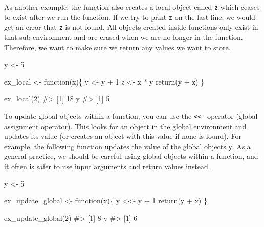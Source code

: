 \documentclass[
  letterpaper,
]{latex/krantz}
\makeatletter
\newenvironment{Shaded}{\begin{snugshade}}{\end{snugshade}}
\newcommand{\CommentTok}[1]{\textcolor[rgb]{0.37,0.37,0.37}{#1}}
\newcommand{\ControlFlowTok}[1]{\textcolor[rgb]{0.00,0.23,0.31}{#1}}
\newcommand{\DecValTok}[1]{\textcolor[rgb]{0.68,0.00,0.00}{#1}}
\newcommand{\FunctionTok}[1]{\textcolor[rgb]{0.28,0.35,0.67}{#1}}
\newcommand{\NormalTok}[1]{\textcolor[rgb]{0.00,0.23,0.31}{#1}}
\newcommand{\OtherTok}[1]{\textcolor[rgb]{0.00,0.23,0.31}{#1}}
\newcommand{\SpecialCharTok}[1]{\textcolor[rgb]{0.37,0.37,0.37}{#1}}
\newenvironment{kframe}{%
\medskip{}
\setlength{\fboxsep}{.8em}
 \def\at@end@of@kframe{}%
 \ifinner\ifhmode%
  \def\at@end@of@kframe{\end{minipage}}%
  \begin{minipage}{\columnwidth}%
 \fi\fi%
 \def\FrameCommand##1{\hskip\@totalleftmargin \hskip-\fboxsep
 \colorbox{shadecolor}{##1}\hskip-\fboxsep
     \hskip-\linewidth \hskip-\@totalleftmargin \hskip\columnwidth}%
 \MakeFramed {\advance\hsize-\width
   \@totalleftmargin\z@ \linewidth\hsize
   \@setminipage}}%
 {\par\unskip\endMakeFramed%
 \at@end@of@kframe}
\renewenvironment{Shaded}{\begin{kframe}}{\end{kframe}}
\makeatother
\begin{document}
As another example, the function also creates a local object called
\texttt{z} which ceases to exist after we run the function. If we try to
print \texttt{z} on the last line, we would get an error that \texttt{z}
is not found. All objects created inside functions only exist in that
sub-environment and are erased when we are no longer in the function.
Therefore, we want to make sure we return any values we want to store.

\begin{Shaded}
\begin{Highlighting}[]
\NormalTok{y }\OtherTok{\textless{}{-}} \DecValTok{5}

\NormalTok{ex\_local }\OtherTok{\textless{}{-}} \ControlFlowTok{function}\NormalTok{(x)\{}
\NormalTok{  y }\OtherTok{\textless{}{-}}\NormalTok{ y }\SpecialCharTok{+} \DecValTok{1}
\NormalTok{  z }\OtherTok{\textless{}{-}}\NormalTok{ x }\SpecialCharTok{*}\NormalTok{ y}
  \FunctionTok{return}\NormalTok{(y }\SpecialCharTok{+}\NormalTok{ z)}
\NormalTok{\}}

\FunctionTok{ex\_local}\NormalTok{(}\DecValTok{2}\NormalTok{)}
\CommentTok{\#\textgreater{} [1] 18}
\NormalTok{y}
\CommentTok{\#\textgreater{} [1] 5}
\end{Highlighting}
\end{Shaded}

To update global objects within a function, you can use the
\texttt{\textless{}\textless{}-} operator (global assignment
operator). This looks for an object in the
global environment and updates its value (or creates an object with this
value if none is found). For example, the following function updates the
value of the global objects \texttt{y}. As a general practice, we should
be careful using global objects within a function, and it often is safer
to use input arguments and return values instead.

\begin{Shaded}
\begin{Highlighting}[]
\NormalTok{y }\OtherTok{\textless{}{-}} \DecValTok{5}

\NormalTok{ex\_update\_global }\OtherTok{\textless{}{-}} \ControlFlowTok{function}\NormalTok{(x)\{}
\NormalTok{  y }\OtherTok{\textless{}\textless{}{-}}\NormalTok{ y }\SpecialCharTok{+} \DecValTok{1}
  \FunctionTok{return}\NormalTok{(y }\SpecialCharTok{+}\NormalTok{ x)}
\NormalTok{\}}

\FunctionTok{ex\_update\_global}\NormalTok{(}\DecValTok{2}\NormalTok{)}
\CommentTok{\#\textgreater{} [1] 8}
\NormalTok{y}
\CommentTok{\#\textgreater{} [1] 6}
\end{Highlighting}
\end{Shaded}
\end{document}
